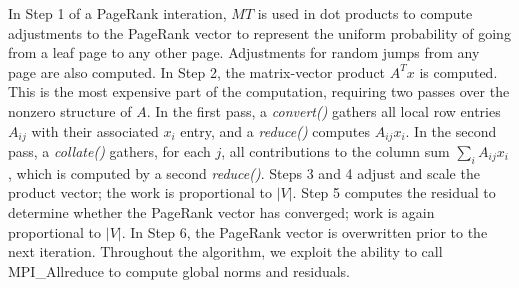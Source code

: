 In Step 1 of a PageRank interation, $MT$ is used in dot products to
compute adjustments to the PageRank vector to represent the uniform
probability of going from a leaf page to any other page.  Adjustments
for random jumps from any page are also computed.  In Step 2, the
matrix-vector product $A^T x$ is computed.  This is the most expensive
part of the computation, requiring two passes over the nonzero
structure of $A$.  In the first pass, a {\it convert()} gathers all
local row entries $A_{ij}$ with their associated $x_i$ entry, and a
{\it reduce()} computes $A_{ij} x_i$.  In the second pass, a {\it
collate()} gathers, for each $j$, all contributions to the column sum
$\sum_i A_{ij} x_i$, which is computed by a second {\it reduce()}.
Steps 3 and 4 adjust and scale the product vector; the work is
proportional to $|V|$.  Step 5 computes the residual to determine
whether the PageRank vector has converged; work is again proportional
to $|V|$.  In Step 6, the PageRank vector is overwritten prior to the
next iteration.  Throughout the algorithm, we exploit the ability to
call MPI\_Allreduce to compute global norms and residuals.

